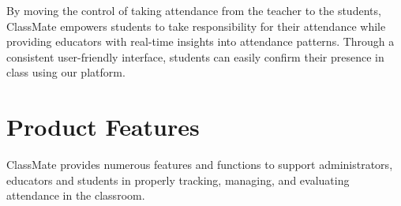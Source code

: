 \documentclass[letterpaper,12pt,oneside,listof=totoc]{scrreprt}
\begin{document}
By moving the control of taking attendance from the teacher to the students, ClassMate empowers students to take responsibility for their attendance while providing educators with real-time insights into attendance patterns. Through a consistent user-friendly interface, students can easily confirm their presence in class using our platform.


\section{Product Features}
ClassMate provides numerous features and functions to support administrators, educators and students in properly tracking, managing, and evaluating attendance in the classroom.
\end{document}
